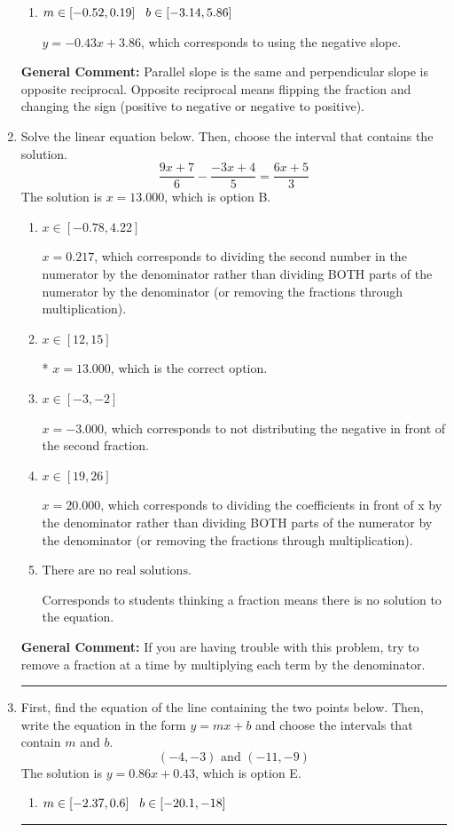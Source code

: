 \documentclass{extbook}[14pt]
\newcommand{\litem}[1]{\item #1

\rule{\textwidth}{0.4pt}}
\begin{document}
\begin{enumerate}
{\begin{enumerate}[label=\Alph*.]
 $y = 0.43x - 8.14$, which corresponds to using the correct slope and getting the negative $y$-intercept.
\item \( m \in [-0.52, 0.19] \hspace*{3mm} b \in [-3.14, 5.86] \)

 $y = -0.43x + 3.86$, which corresponds to using the negative slope.
\end{enumerate}

\textbf{General Comment:} Parallel slope is the same and perpendicular slope is opposite reciprocal. Opposite reciprocal means flipping the fraction and changing the sign (positive to negative or negative to positive).
}
\litem{
Solve the linear equation below. Then, choose the interval that contains the solution.
\[ \frac{9x + 7}{6} - \frac{-3x + 4}{5} = \frac{6x + 5}{3} \]The solution is \( x = 13.000 \), which is option B.\begin{enumerate}[label=\Alph*.]
\item \( x \in [-0.78, 4.22] \)

 $x = 0.217$, which corresponds to dividing the second number in the numerator by the denominator rather than dividing BOTH parts of the numerator by the denominator (or removing the fractions through multiplication).
\item \( x \in [12, 15] \)

* $x = 13.000$, which is the correct option.
\item \( x \in [-3, -2] \)

 $x = -3.000$, which corresponds to not distributing the negative in front of the second fraction.
\item \( x \in [19, 26] \)

 $x = 20.000$, which corresponds to dividing the coefficients in front of x by the denominator rather than dividing BOTH parts of the numerator by the denominator (or removing the fractions through multiplication).
\item \( \text{There are no real solutions.} \)

Corresponds to students thinking a fraction means there is no solution to the equation.
\end{enumerate}

\textbf{General Comment:} If you are having trouble with this problem, try to remove a fraction at a time by multiplying each term by the denominator.
}
\litem{
First, find the equation of the line containing the two points below. Then, write the equation in the form $ y=mx+b $ and choose the intervals that contain $m$ and $b$.
\[ (-4, -3) \text{ and } (-11, -9) \]The solution is \( y = 0.86x + 0.43 \), which is option E.\begin{enumerate}[label=\Alph*.]
\item \( m \in [-2.37, 0.6] \hspace*{3mm} b \in [-20.1, -18] \)


\end{enumerate}}
\end{enumerate}
\end{document}
